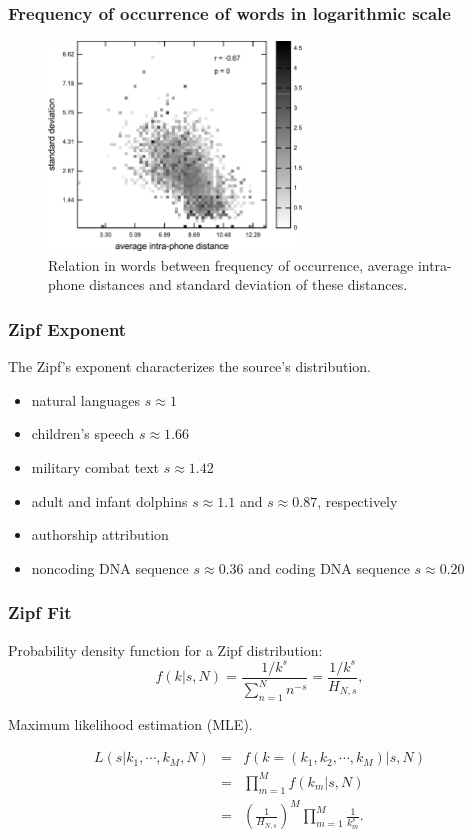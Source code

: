 \documentclass[notes]{beamer}
\begin{document}
\frame
{
  \frametitle{Frequency of occurrence of words in logarithmic scale}
  \vspace{-0.1cm}
  \begin{figure}[h]
  \centering
  \includegraphics[width=0.6\textwidth]{imagespresentation/ulysses_words_intra_phone_distance_freq_occ_avg_std.pdf}
  \caption{Relation in words between frequency of occurrence, average intra-phone distances and standard deviation of these distances.}
  \end{figure}
}

\frame
{
  \frametitle{Zipf Exponent}

  The Zipf's exponent characterizes the source's distribution.

  \begin{itemize}
  \item natural languages $s \approx 1$ \citep{piotrovskii}
  \item children's speech $s \approx 1.66$ \citep{piotrovskii}
  \item military combat text $s \approx 1.42$ \citep{kolguskin1960}
  \item adult and infant dolphins $s \approx 1.1$ and $s \approx 0.87$, respectively \citep{mccowan1999}
  \item authorship attribution \citep{havlin1995}
  \item noncoding DNA sequence $s \approx 0.36$ and coding DNA sequence $s \approx 0.20$ \citep{mantegna1994}
  \end{itemize}
}

\frame
{
  \frametitle{Zipf Fit}
Probability density function for a Zipf distribution:
\begin{equation}
\label{eq:zipf_relation}
f(k | s, N) = \frac{1/k^s}{\sum_{n=1}^{N} n^{-s}} = \frac{1/k^s}{H_{N,s}} ,
\end{equation} 

Maximum likelihood estimation (MLE).

\begin{eqnarray}
L(s|k_1,\cdots,k_M,N) &=& f(k=(k_1, k_2, \cdots, k_M) | s, N) \nonumber \\ 
                      &=& \prod_{m=1}^{M} f(k_m | s, N) \nonumber \\
                      &=& \left( \frac{1}{H_{N,s}} \right)^M \prod_{m=1}^{M} \frac{1}{k_m^s} .
\end{eqnarray}

}
\end{document}
